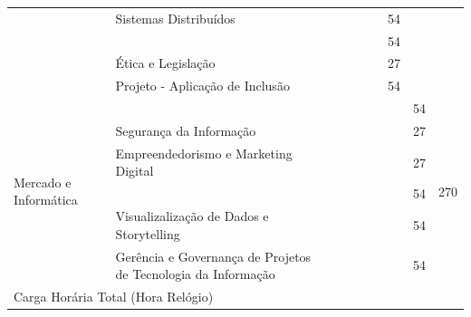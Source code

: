 \documentclass[11pt,fleqn]{book} %
\begin{document}
\begin{table}[]
{\begin{tabular}{|l|l|c|c|c|c|c|c|c|}
			& Sistemas Distribuídos                                         &                 &                 &                 &                 & 54              &                 &                      \\ \cline{2-8}
			& \nameref{disc:metodologia}                                    &                 &                 &                 &                 & 54              &                 &                      \\ \cline{2-8}
			& Ética e Legislação                                            &                 &                 &                 &                 & 27              &                 &                      \\ \cline{2-8}
			& Projeto - Aplicação de Inclusão                               &                 &                 &                 &                 & 54              &                 &                      \\ \hline
			\multirow{6}{*}{Mercado e Informática}                           
			& \nameref{disc:ia}                                             &                 &                 &                 &                 &                 & 54              & \multirow{6}{*}{270} \\ \cline{2-8}
			& Segurança da Informação                                       &                 &                 &                 &                 &                 & 27              &                      \\ \cline{2-8}
			& Empreendedorismo e Marketing Digital                          &                 &                 &                 &                 &                 & 27              &                      \\ \cline{2-8}
			& \nameref{disc:datascience}                                    &                 &                 &                 &                 &                 & 54              &                      \\ \cline{2-8}
			& Visualizalização de Dados e Storytelling                      &                 &                 &                 &                 &                 & 54              &                      \\ \cline{2-8}
			& Gerência e Governança de Projetos de Tecnologia da Informação &                 &                 &                 &                 &                 & 54              &                      \\ \hline
			\multicolumn{8}{|l|}{Carga Horária Total (Hora Relógio)}                                                                                                                                                                                     

\end{tabular}}
\end{table}
\end{document}
